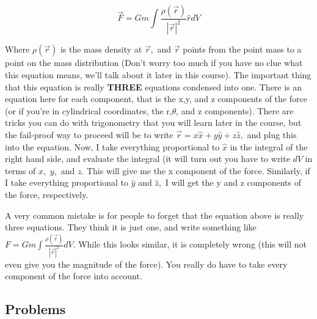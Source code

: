 \documentclass[12pt]{book}
\begin{document}
\begin{equation*}
 \vec{F} = Gm \int \frac{\rho(\vec{r})}{|\vec{r}|^2} \hat{r} dV
\end{equation*}

 \noindent Where $\rho(\vec{r})$ is the mass density at $\vec{r},$ and $\vec{r}$ points from the point mass to a point on the mass distribution (Don't worry too much if you have no clue what this equation means, we'll talk about it later in this course). The important thing that this equation is really {\bf THREE} equations condensed into one. There is an equation here for each component, that is the x,y, and z components of the force (or if you're in cylindrical coordinates, the r,$\theta$, and z components). There are tricks you can do with trigonometry that you will learn later in the course, but the fail-proof way to proceed will be to write $\vec{r} = x \hat{x} + y \hat{y} + z \hat{z},$ and plug this into the equation. Now, I take everything proportional to $\hat{x}$ in the integral of the right hand side, and evaluate the integral (it will turn out you have to write $dV$ in terms of $x,$ $y,$ and $z.$ This will give me the x component of the force. Similarly, if I take everything proportional to $\hat{
y}
$ and $\hat{z},$ I will get the y and z components of the force, respectively.

 A very common mistake is for people to forget that the equation above is really three equations. They think it is just one, and write something like $F = Gm \int \frac{\rho(\vec{r})}{|\vec{r}|^2} dV.$ While this looks similar, it is completely wrong (this will not even give you the magnitude of the force). You really do have to take every component of the force into account.

 \pagebreak
 
\subsection{Problems}
\end{document}
